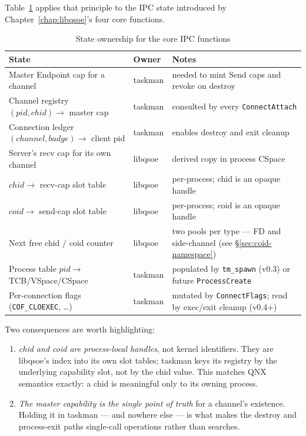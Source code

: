 Table~\ref{tab:state-split} applies that principle to the IPC state
introduced by Chapter~\ref{chap:libqsoe}'s four core functions.

\begin{table}[ht]
\centering
\small
\begin{tabular}{@{}p{6.5cm}lp{5cm}@{}}
    \toprule
    \textbf{State}                                & \textbf{Owner} & \textbf{Notes} \\
    \midrule
    Master Endpoint cap for a channel             & taskman & needed to mint Send caps and revoke on destroy \\
    Channel registry $(pid, chid) \to$ master cap & taskman & consulted by every \texttt{ConnectAttach} \\
    Connection ledger $(channel, badge) \to$ client pid & taskman & enables destroy and exit cleanup \\
    Server's recv cap for its own channel         & libqsoe & derived copy in process CSpace \\
    $chid \to$ recv-cap slot table                & libqsoe & per-process; chid is an opaque handle \\
    $coid \to$ send-cap slot table                & libqsoe & per-process; coid is an opaque handle \\
    Next free chid / coid counter                 & libqsoe & two pools per type --- FD and side-channel (see \S\ref{sec:coid-namespace}) \\
    Process table $pid \to$ TCB/VSpace/CSpace     & taskman & populated by \texttt{tm\_spawn} (v0.3) or future \texttt{ProcessCreate} \\
    Per-connection flags (\texttt{COF\_CLOEXEC}, \ldots) & taskman & mutated by \texttt{ConnectFlags}; read by exec/exit cleanup (v0.4+) \\
    \bottomrule
\end{tabular}
\caption{State ownership for the core IPC functions}
\label{tab:state-split}
\end{table}

Two consequences are worth highlighting:

\begin{enumerate}
    \item \emph{chid and coid are process-local handles}, not kernel
          identifiers.  They are libqsoe's index into its own slot
          tables; taskman keys its registry by the underlying
          capability slot, not by the chid value.  This matches QNX
          semantics exactly: a chid is meaningful only to its owning
          process.
    \item \emph{The master capability is the single point of truth} for
          a channel's existence.  Holding it in taskman --- and nowhere
          else --- is what makes the destroy and process-exit paths
          single-call operations rather than searches.
\end{enumerate}

